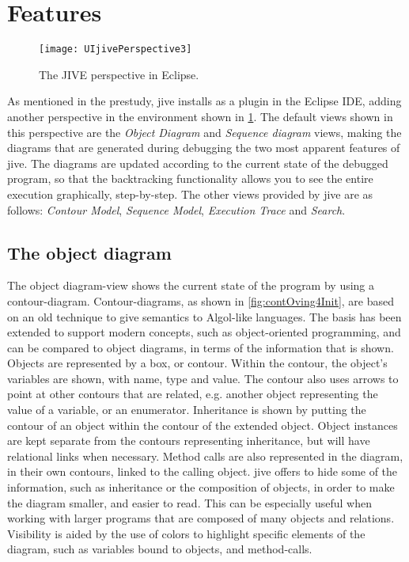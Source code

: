 \section{Features}\label{jiveFeatures}
\begin{figure}[H]
	\centering
	\texttt{[image: UIjivePerspective3]}
	\caption{The JIVE perspective in Eclipse.}
	\label{fig:UIjivePerspective}
\end{figure}

As mentioned in the prestudy, \gls{jive} installs as a plugin in the Eclipse IDE, adding another perspective in the environment shown in \cref{fig:UIjivePerspective}.
The default views shown in this perspective are the \emph{Object Diagram} and \emph{Sequence diagram} views, making the diagrams that are generated during debugging the two most apparent features of \gls{jive}.
The diagrams are updated according to the current state of the debugged program, so that the backtracking functionality allows you to see the entire execution graphically, step-by-step.
The other views provided by \gls{jive} are as follows: \emph{Contour Model}, \emph{Sequence Model}, \emph{Execution Trace} and \emph{Search}.

\subsection{The object diagram}\label{jiveFeatObjectDiag}

The object diagram-view shows the current state of the program by using a contour-diagram.
Contour-diagrams, as shown in \cref{fig:contOving4Init}, are based on an old technique to give semantics to Algol-like languages.
The basis has been extended to support modern concepts, such as object-oriented programming, and can be compared to object diagrams, in terms of the information that is shown.
Objects are represented by a box, or contour.
Within the contour, the object's variables are shown, with name, type and value.
The contour also uses arrows to point at other contours that are related, e.g. another object representing the value of a variable, or an enumerator.
Inheritance is shown by putting the contour of an object within the contour of the extended object. 
Object instances are kept separate from the contours representing inheritance, but will have relational links when necessary.
Method calls are also represented in the diagram, in their own contours, linked to the calling object.
\gls{jive} offers to hide some of the information, such as inheritance or the composition of objects, in order to make the diagram smaller, and easier to read.
This can be especially useful when working with larger programs that are composed of many objects and relations.
Visibility is aided by the use of colors to highlight specific elements of the diagram, such as variables bound to objects, and method-calls.

